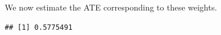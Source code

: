 \documentclass[
  ignorenonframetext,
]{beamer}
\newenvironment{Shaded}{\begin{snugshade}}{\end{snugshade}}
\newcommand{\FunctionTok}[1]{\textcolor[rgb]{0.00,0.00,0.00}{#1}}
\newcommand{\NormalTok}[1]{#1}
\newcommand{\OtherTok}[1]{\textcolor[rgb]{0.56,0.35,0.01}{#1}}
\newcommand{\SpecialCharTok}[1]{\textcolor[rgb]{0.00,0.00,0.00}{#1}}
\begin{document}
\begin{frame}[fragile]{}
\protect\hypertarget{section-17}{}
We now estimate the ATE corresponding to these weights.

\begin{Shaded}
\end{Shaded}

\begin{verbatim}
## [1] 0.5775491
\end{verbatim}
\end{frame}
\end{document}
